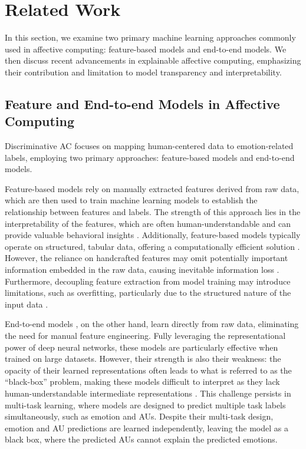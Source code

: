 \section{Related Work}
In this section, we examine two primary machine learning approaches commonly used in affective computing: feature-based models and end-to-end models. We then discuss recent advancements in explainable affective computing, emphasizing their contribution and limitation to model transparency and interpretability.

\subsection{Feature and End-to-end Models in Affective Computing}
    Discriminative AC focuses on mapping human-centered data to emotion-related labels, employing two primary approaches: feature-based models and end-to-end models.
    
    Feature-based models \cite{tsalera2022feature, avola2022affective} rely on manually extracted features derived from raw data, which are then used to train machine learning models to establish the relationship between features and labels. The strength of this approach lies in the interpretability of the features, which are often human-understandable and can provide valuable behavioral insights \cite{bento2022comparing}. Additionally, feature-based models typically operate on structured, tabular data, offering a computationally efficient solution \cite{bisogni2023emotion}. However, the reliance on handcrafted features may omit potentially important information embedded in the raw data, causing inevitable information loss \cite{zhao2019affective, cortinas2023toward}. Furthermore, decoupling feature extraction from model training may introduce limitations, such as overfitting, particularly due to the structured nature of the input data \cite{bengio2013representation}.
    
    End-to-end models \cite{li2020deep}, on the other hand, learn directly from raw data, eliminating the need for manual feature engineering. Fully leveraging the representational power of deep neural networks, these models are particularly effective when trained on large datasets. However, their strength is also their weakness: the opacity of their learned representations often leads to what is referred to as the ``black-box'' problem, making these models difficult to interpret as they lack human-understandable intermediate representations \cite{zhao2019affective}. 
    This challenge persists in multi-task learning, where models are designed to predict multiple task labels simultaneously, such as emotion and AUs. Despite their multi-task design, emotion and AU predictions are learned independently, leaving the model as a black box, where the predicted AUs cannot explain the predicted emotions.

